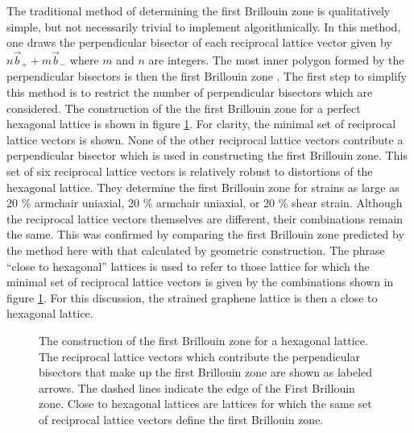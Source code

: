 The traditional method of determining the first Brillouin zone is qualitatively simple, but not necessarily trivial to implement algorithmically.
In this method, one draws the perpendicular bisector of each reciprocal lattice vector given by $n \vec{b}_+ + m \vec{b}_-$ where $m$ and $n$ are integers.
The most inner polygon formed by the perpendicular bisectors is then the first Brillouin zone \cite{Kittel2005}.
The first step to simplify this method is to restrict the number of perpendicular bisectors which are considered.
The construction of the the first Brillouin zone for a perfect hexagonal lattice is shown in figure \ref{fig:sBZ:BZ}.
For clarity, the minimal set of reciprocal lattice vectors is shown.
None of the other reciprocal lattice vectors contribute a perpendicular bisector which is used in constructing the first Brillouin zone.
This set of six reciprocal lattice vectors is relatively robust to distortions of the hexagonal lattice.
They determine the first Brillouin zone for strains as large as 20 \% armchair uniaxial, 20 \% armchair uniaxial, or 20 \% shear strain.
Although the reciprocal lattice vectors themselves are different, their combinations remain the same.
This was confirmed by comparing the first Brillouin zone predicted by the method here with that calculated by geometric construction.
The phrase ``close to hexagonal'' lattices is used to refer to those lattice for which the minimal set of reciprocal lattice vectors is given by the combinations shown in figure \ref{fig:sBZ:BZ}.
For this discussion, the strained graphene lattice is then a close to hexagonal lattice.

\begin{figure}
	\begin{center}
	
	\end{center}
	\caption{\label{fig:sBZ:BZ} The construction of the first Brillouin zone for a hexagonal lattice.  The reciprocal lattice vectors which contribute the perpendicular bisectors that make up the first Brillouin zone are shown as labeled arrows. The dashed lines indicate the edge of the First Brillouin zone.  Close to hexagonal lattices are lattices for which the same set of reciprocal lattice vectors define the first Brillouin zone.}
\end{figure}

